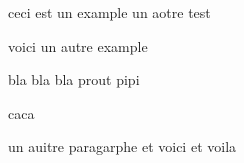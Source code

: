 \beguindocument
ceci est un example
un aotre test

voici un autre example

bla bla bla
prout
pipi


caca


un auitre paragarphe et voici et voila